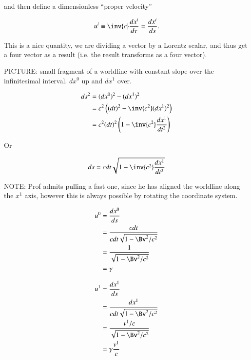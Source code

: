 and then define a dimensionless ``proper velocity''

\begin{equation}\label{eqn:relativisticElectrodynamicsL7:61}
u^i \equiv \inv{c} \frac{dx^i}{d\tau} = \frac{dx^i}{ds}.
\end{equation}

This is a nice quantity, we are dividing a vector by a Lorentz scalar, and thus get a four vector as a result (i.e. the result transforms as a four vector).

PICTURE: small fragment of a worldline with constant slope over the infinitesimal interval.  $dx^0$ up and $dx^1$ over.


\begin{align*}
ds^2 
&= (dx^0)^2 - (dx^1)^2 \\
&= c^2 \left( (dt)^2 - \inv{c^2} (dx^1)^2 \right) \\
&= c^2 (dt)^2 \left( 1 - \inv{c^2} \frac{dx^1}{dt^2} \right) 
\end{align*}

Or 

\begin{align}\label{eqn:relativisticElectrodynamicsL7:90}
ds = c dt \sqrt{1 - \inv{c^2} \frac{dx^1}{dt^2} }
\end{align}

NOTE: Prof admits pulling a fast one, since he has aligned the worldline along the $x^1$ axis, however this is always possible by rotating the coordinate system.

\begin{align*}
u^0 
&= \frac{dx^0}{ds} \\
&= \frac{c dt}{ c dt \sqrt{ 1 - \Bv^2/c^2} } \\
&= \frac{1}{ \sqrt{ 1 - \Bv^2/c^2} } \\
&= \gamma
\end{align*}

\begin{align*}
u^1 
&= \frac{dx^1}{ds} \\
&= \frac{dx^1 }{ c dt \sqrt{ 1 - \Bv^2/c^2} } \\
&= \frac{v^1/c}{ \sqrt{ 1 - \Bv^2/c^2} } \\
&= \gamma \frac{v^1}{c}
\end{align*}

